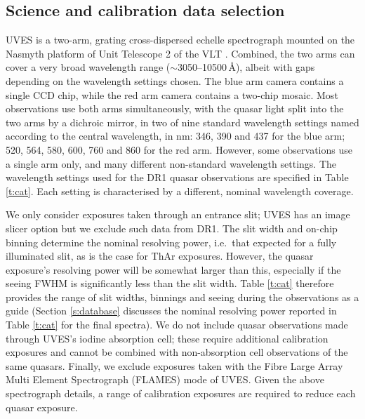\documentclass[fleqn,usenatbib,usedcolumn]{mnras}
\newcommand{\Sref}[1]{Section \ref{#1}}
\newcommand{\Tref}[1]{Table \ref{#1}}
\begin{document}
\subsection{Science and calibration data selection}\label{ss:selection}

UVES is a two-arm, grating cross-dispersed echelle spectrograph mounted on the Nasmyth platform of Unit Telescope 2 of the VLT \citep{Dekker:2000:534}. Combined, the two arms can cover a very broad wavelength range ($\sim$3050--10500\,\AA), albeit with gaps depending on the wavelength settings chosen. The blue arm camera contains a single CCD chip, while the red arm camera contains a two-chip mosaic. Most observations use both arms simultaneously, with the quasar light split into the two arms by a dichroic mirror, in two of nine standard wavelength settings named according to the central wavelength, in nm: 346, 390 and 437 for the blue arm; 520, 564, 580, 600, 760 and 860 for the red arm. However, some observations use a single arm only, and many different non-standard wavelength settings. The wavelength settings used for the DR1 quasar observations are specified in \Tref{t:cat}. Each setting is characterised by a different, nominal wavelength coverage.

We only consider exposures taken through an entrance slit; UVES has an image slicer option but we exclude such data from DR1. The slit width and on-chip binning determine the nominal resolving power, i.e.\ that expected for a fully illuminated slit, as is the case for ThAr exposures. However, the quasar exposure's resolving power will be somewhat larger than this, especially if the seeing FWHM is significantly less than the slit width. \Tref{t:cat} therefore provides the range of slit widths, binnings and seeing during the observations as a guide (\Sref{s:database} discusses the nominal resolving power reported in \Tref{t:cat} for the final spectra). We do not include quasar observations made through UVES's iodine absorption cell; these require additional calibration exposures and cannot be combined with non-absorption cell observations of the same quasars. Finally, we exclude exposures taken with the Fibre Large Array Multi Element Spectrograph (FLAMES) mode of UVES. Given the above spectrograph details, a range of calibration exposures are required to reduce each quasar exposure.
\end{document}
